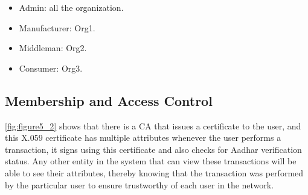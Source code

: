 \begin{itemize}
  \item Admin: all the organization.
  \item Manufacturer: Org1.
  \item Middleman: Org2.
  \item Consumer: Org3.
  
\end{itemize}
    

\subsection{Membership and Access Control}

\noindent \ref{fig:figure5_2} shows that there is a CA that issues a certificate to the user, and this X.059 certificate has multiple attributes whenever 
the user performs a transaction, it signs using this certificate and also checks for Aadhar verification status. Any other entity 
in the system that can view these transactions will be able to see their attributes, thereby knowing that the transaction was 
performed by the particular user to ensure trustworthy of each user in the network.

